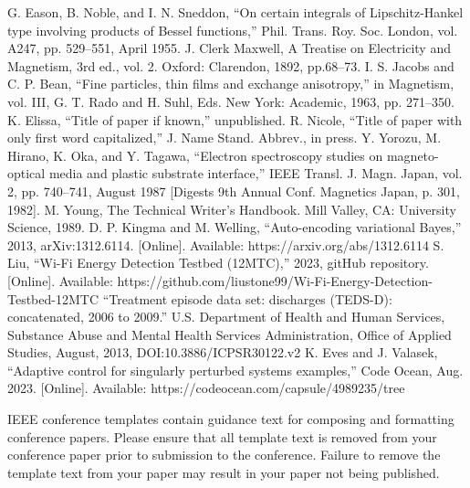 \documentclass[conference]{IEEEtran}
\begin{document}
    \begin{thebibliography}{00}
     G. Eason, B. Noble, and I. N. Sneddon, ``On certain integrals of Lipschitz-Hankel type involving products of Bessel functions,'' Phil. Trans. Roy. Soc. London, vol. A247, pp. 529--551, April 1955.
     J. Clerk Maxwell, A Treatise on Electricity and Magnetism, 3rd ed., vol. 2. Oxford: Clarendon, 1892, pp.68--73.
     I. S. Jacobs and C. P. Bean, ``Fine particles, thin films and exchange anisotropy,'' in Magnetism, vol. III, G. T. Rado and H. Suhl, Eds. New York: Academic, 1963, pp. 271--350.
     K. Elissa, ``Title of paper if known,'' unpublished.
     R. Nicole, ``Title of paper with only first word capitalized,'' J. Name Stand. Abbrev., in press.
     Y. Yorozu, M. Hirano, K. Oka, and Y. Tagawa, ``Electron spectroscopy studies on magneto-optical media and plastic substrate interface,'' IEEE Transl. J. Magn. Japan, vol. 2, pp. 740--741, August 1987 [Digests 9th Annual Conf. Magnetics Japan, p. 301, 1982].
     M. Young, The Technical Writer's Handbook. Mill Valley, CA: University Science, 1989.
     D. P. Kingma and M. Welling, ``Auto-encoding variational Bayes,'' 2013, arXiv:1312.6114. [Online]. Available: https://arxiv.org/abs/1312.6114
     S. Liu, ``Wi-Fi Energy Detection Testbed (12MTC),'' 2023, gitHub repository. [Online]. Available: https://github.com/liustone99/Wi-Fi-Energy-Detection-Testbed-12MTC
     ``Treatment episode data set: discharges (TEDS-D): concatenated, 2006 to 2009.'' U.S. Department of Health and Human Services, Substance Abuse and Mental Health Services Administration, Office of Applied Studies, August, 2013, DOI:10.3886/ICPSR30122.v2
     K. Eves and J. Valasek, ``Adaptive control for singularly perturbed systems examples,'' Code Ocean, Aug. 2023. [Online]. Available: https://codeocean.com/capsule/4989235/tree
    \end{thebibliography}

    \vspace{12pt}
    \color{red}
    IEEE conference templates contain guidance text for composing and formatting conference papers. Please ensure that all template text is removed from your conference paper prior to submission to the conference. Failure to remove the template text from your paper may result in your paper not being published.
\end{document}
